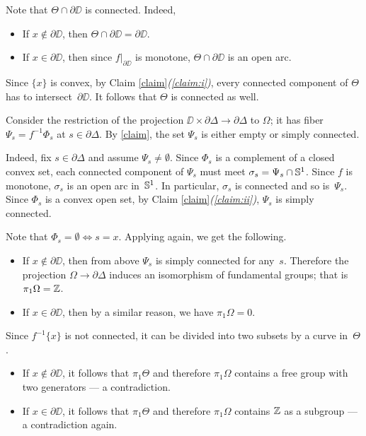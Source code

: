 \documentclass{article}
\begin{document}
Note that $\Theta\cap \partial\DD$ is connected.
Indeed,
\begin{itemize}
\item If $x\notin \partial\DD$, then $\Theta\cap \partial\DD=\partial \DD$. 
\item If $x\in \partial\DD$, then since $f|_{\partial\DD}$ is monotone, $\Theta\cap \partial\DD$ is an open arc.
\end{itemize}
Since $\{x\}$ is convex, by Claim \ref{claim}\textit{(\ref{claim:i})}, every connected component of $\Theta$ has to intersect~$\partial\DD$.
It follows that $\Theta$ is connected as well.

Consider the restriction of the projection $\DD\times\partial\Delta\to \partial\Delta$ to $\Omega$;
it has fiber $\Psi_s=f^{-1}\Phi_s$ at $s\in\partial\Delta$.
By \ref{claim}, the set $\Psi_s$ is either empty or simply connected.

Indeed, fix $s\in\partial\Delta$ and assume $\Psi_s\ne \emptyset$.
Since $\Phi_s$ is a complement of a closed convex set,
each connected component of $\Psi_s$ must meet $\sigma_s=\Psi_s\cap\mathbb{S}^1$.
Since $f$ is monotone, $\sigma_s$ is an open arc in~$\mathbb{S}^1$.
In particular, $\sigma_s$ is connected and so is~$\Psi_s$.
Since $\Phi_s$ is a convex open set, by Claim \ref{claim}\textit{(\ref{claim:ii})}, $\Psi_s$ is simply connected.

Note that $\Phi_s=\emptyset\iff s=x$.
Applying \cite[Theorem 2]{ungar} again, we get the following.
\begin{itemize}
\item If $x\notin\partial\DD$, then from above $\Psi_s$ is simply connected for any~$s$.
Therefore the projection $\Omega\to \partial\Delta$ induces an isomorphism of fundamental groups; that is $\pi_1\Omega=\mathbb{Z}$.
\item If $x\in\partial\DD$, then by a similar reason, we have $\pi_1\Omega=0$.
\end{itemize}

Since $f^{-1}\{x\}$ is not connected, it can be divided into two subsets by a curve in~$\Theta$.
\begin{itemize}
\item If $x\notin\partial \DD$, it follows that $\pi_1\Theta$ and therefore $\pi_1\Omega$ contains a free group with two generators --- a contradiction.
\item If $x\in\partial\DD$, it follows that $\pi_1\Theta$ and therefore $\pi_1\Omega$ contains $\mathbb{Z}$ as a subgroup --- a contradiction again.\qeds
\end{itemize}
\end{document}
